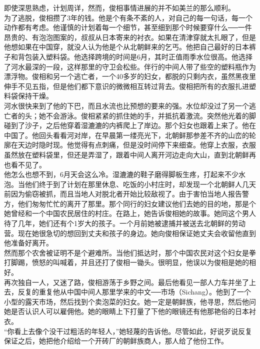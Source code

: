 即使深思熟虑，计划周详，然而，俊相事情进展的并不如美兰的那么顺利。\\

为了逃脱，俊相攒了3年的钱。他是个有条不紊的人，对自己的每一句话，每一个动作都有考虑。他谨慎的计划着每一个细节，甚至细到那个时候要穿什么──一件昂贵的、有泡泡图案的，叔叔从日本寄来的衬衣。如果在清津穿就太扎眼了，但是他想如果在中国穿，就没人认为他是个从北朝鲜来的乞丐。他把自己最好的日本裤子和背包装入塑料袋。他选择跨境的时间是6月，其时正值雨季水位很高。他选择了河水最深的一段，这样那里的守卫会松些。伴行的中间人带了些空的塑料瓶作为漂浮物。俊相和另一个逃亡者，一个40多岁的妇女，都脱的只剩内衣，虽然黑夜里伸手不见五指，但是他们都下意识的微微相互转过背去。俊相把所有的衣服扎进塑料袋保持干燥。\\

河水很快来到了他的下巴，而且水流也比预想的要来的强。水位却没过了另一个逃亡者的头；她不会游泳。俊相紧紧的抓住她的手，并抵抗着激流。突然他光着的脚碰到了沙子，之后他穿着湿漉漉的内裤爬上了岸边。那个妇女也跟着上来了。他在中国了。他回头看看河对岸，在早晨第一缕亮光下，北朝鲜那参差不齐的山峦的轮廓在天边时隐时现。他觉得有点刺痛，但是没时间停下来细查。他穿上衣服，衣服虽然放在塑料袋里，但还是弄湿了，跟着中间人离开河边走向大山，直到北朝鲜再也看不见了。\\

他怎么也想不到，6月天会这么冷。湿漉漉的鞋子磨得脚板生疼，打起来不少水泡。当他们终于到了计划在那里休息、吃饭的小村庄时，却发现一个北朝鲜人几天前因为偷窃被抓，而且当地人对脱北者开始比较敌视了。由于害怕当地人报告警方，他们匆匆忙忙的离开了那里。那个同行的妇女建议他们去她的目的地，那是个她曾经和一个中国农民居住的村庄。在路上，她告诉俊相她的故事。她同这个男人待了几年，她们还有个1岁大的孩子。一个月前她被逮捕并被送去北朝鲜的劳动营。现在她很急切的想回到丈夫和孩子的身边。她向俊相保证她丈夫会收留他直到他准备好离开。\\

然而那个农舍被证明不是个避难所。当他们抵达时，那个中国农民对这个妇女是拳打脚踢，愤怒的叫喊着，并且还打了俊相一锄头。很明显，他误以为俊相是她的相好。\\

再次独自一人，又迷了路，俊相游荡于乡野之间。最后他看见一部人力车并坐了上去，反复的重复他从中国中间人那里学来的中文──市场（Sichang）。他到了一个小型的露天市场，然后找到个卖泡菜的妇女。她一定是朝鲜族，他寻思，然后他问她是否认识人可以雇佣他。她的眼睛上下打量了下他的眼镜还有他那艳俗的日本衬衣。\\

“你看上去像个没干过粗活的年轻人，”她轻蔑的告诉他。尽管如此，好说歹说反复保证之后，她把他介绍给一个开砖厂的朝鲜族商人，那人给了他份工作。\\

